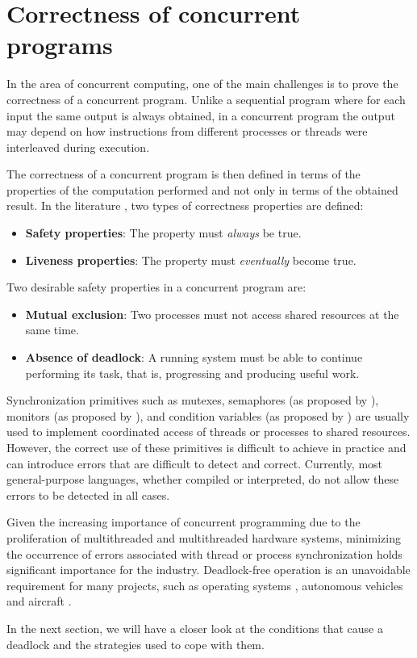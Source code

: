 \section{Correctness of concurrent programs}

In the area of concurrent computing, one of the main challenges is
to prove the correctness of a concurrent program.
Unlike a sequential program where for each input the same output
is always obtained, in a concurrent program the output may depend
on how instructions from different processes or
threads were interleaved during execution.

The correctness of a concurrent program is then defined
in terms of the properties of the computation performed
and not only in terms of the obtained result.
In the literature \cite{ben-ari2006,coulouris2012,tanenbaum2017},
two types of correctness properties are defined:

\begin{itemize}
    \item \textbf{Safety properties}: The property must \emph{always} be true.
    \item \textbf{Liveness properties}: The property must \emph{eventually} become true.
\end{itemize}

Two desirable safety properties in a concurrent program are:

\begin{itemize}
    \item \textbf{Mutual exclusion}: Two processes must not access shared resources at the same time.
    \item \textbf{Absence of deadlock}: A running system must be able to continue performing its task,
          that is, progressing and producing useful work.
\end{itemize}

Synchronization primitives such as mutexes,
semaphores (as proposed by \cite{Dijkstra2002}),
monitors (as proposed by \cite{hansen1972structured,hansen1973operating}),
and condition variables (as proposed by \cite{hoare1974monitors}) are usually used
to implement coordinated access of threads or processes to shared resources.
However, the correct use of these primitives is difficult to achieve in practice
and can introduce errors that are difficult to detect and correct.
Currently, most general-purpose languages, whether compiled or interpreted,
do not allow these errors to be detected in all cases.

Given the increasing importance of concurrent programming due to the proliferation
of multithreaded and multithreaded hardware systems,
minimizing the occurrence of errors associated with thread or process synchronization
holds significant importance for the industry.
Deadlock-free operation is an unavoidable requirement for many projects, such as
operating systems \cite{ArpaciDusseau2018}, autonomous vehicles \cite{Perronnet2019}
and aircraft \cite{carreno2005safety,monzon2009deadlock}.

In the next section, we will have a closer look at the conditions that cause a deadlock
and the strategies used to cope with them.